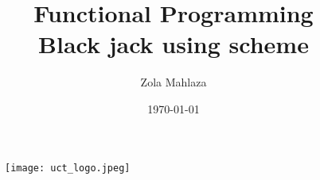 \documentclass[11pt]{article}
\author{Zola Mahlaza}
\title{\textbf{Functional Programming} \\ Black jack using scheme}
\date{\today}
\begin{document}
	\begin{figure}
	\centering
	\texttt{[image: uct\_logo.jpeg]}
	\end{figure}
	\maketitle
	
	
	
\end{document}
